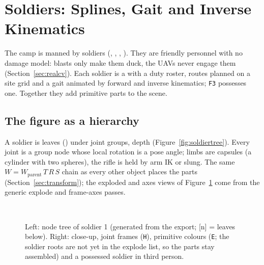 \section{Soldiers: Splines, Gait and Inverse Kinematics}\label{sec:soldiers}
The camp is manned by \nSoldiers{} soldiers (, , , ). They are friendly personnel with no damage model: blasts only make them duck, the UAVs never engage them (Section~\ref{sec:realcv}). Each soldier is a  with a duty roster, routes planned on a site grid and a gait animated by forward and inverse kinematics; \texttt{F3} possesses one. Together they add \garrisonParts{} primitive parts to the scene.

\subsection{The figure as a hierarchy}
A soldier is \soldierParts{} leaves (\soldierPrims) under \soldierGroups{} joint groups, depth \soldierDepth{} (Figure~\ref{fig:soldiertree}). Every joint is a group node whose local rotation is a pose angle; limbs are capsules (a cylinder with two spheres), the rifle is held by arm IK or slung. The same $W=W_\text{parent}\,T\,R\,S$ chain as every other object places the parts (Section~\ref{sec:transform}); the exploded and axes views of Figure~\ref{fig:soldierviews} come from the generic explode and frame-axes passes.
\begin{figure}[h]
\centering
\begin{minipage}[c]{0.40\linewidth}\centering\resizebox{\linewidth}{!}{}\end{minipage}\hfill
\begin{minipage}[c]{0.58\linewidth}\centering
{}\hfill{}\\[1mm]
\hfill{}
\end{minipage}
\caption{Left: node tree of soldier 1 (generated from the export; [n] = leaves below). Right: close-up, joint frames (\texttt{H}), primitive colours (\texttt{E}; the soldier roots are not yet in the explode list, so the parts stay assembled) and a possessed soldier in third person.}\label{fig:soldiertree}\label{fig:soldierviews}
\end{figure}


